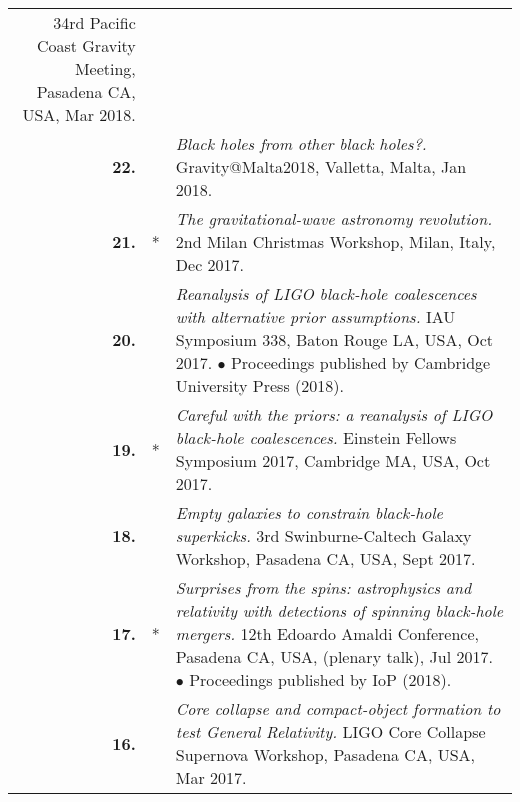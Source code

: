 {\begin{longtable}{rp{0.3cm}p{15.8cm}}
\newline{}
34rd Pacific Coast Gravity Meeting, Pasadena CA, USA, Mar 2018.
\vspace{0.05cm}\\
%
\textbf{22.} &  & \textit{Black holes from other black holes?.}
\newline{}
Gravity@Malta2018, Valletta, Malta, Jan 2018.
\vspace{0.05cm}\\
%
\textbf{21.} & * & \textit{The gravitational-wave astronomy revolution.}
\newline{}
2nd Milan Christmas Workshop, Milan, Italy, Dec 2017.
\vspace{0.05cm}\\
%
\textbf{20.} &  & \textit{Reanalysis of LIGO black-hole coalescences with alternative prior assumptions.}
\newline{}
IAU Symposium 338, Baton Rouge LA, USA, Oct 2017.
\newline{}
\textcolor{color1}{$\bullet$} Proceedings published by Cambridge University Press (2018).
\vspace{0.05cm}\\
%
\textbf{19.} & * & \textit{Careful with the priors: a reanalysis of LIGO black-hole coalescences.}
\newline{}
Einstein Fellows Symposium 2017, Cambridge MA, USA, Oct 2017.
\vspace{0.05cm}\\
%
\textbf{18.} &  & \textit{Empty galaxies to constrain black-hole superkicks.}
\newline{}
3rd Swinburne-Caltech Galaxy Workshop, Pasadena CA, USA, Sept 2017.
\vspace{0.05cm}\\
%
\textbf{17.} & * & \textit{Surprises from the spins: astrophysics and relativity with detections of spinning black-hole mergers.}
\newline{}
12th Edoardo Amaldi Conference, Pasadena CA, USA, (plenary talk), Jul 2017.
\newline{}
\textcolor{color1}{$\bullet$} Proceedings published by IoP (2018).
\vspace{0.05cm}\\
%
\textbf{16.} &  & \textit{Core collapse and compact-object formation to test General Relativity.}
\newline{}
LIGO Core Collapse Supernova Workshop, Pasadena CA, USA, Mar 2017.
\vspace{0.05cm}\\

\end{longtable}}
